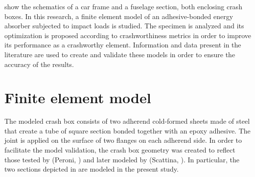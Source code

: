 \documentclass[cmfonts]{witpress}
\begin{document}
 show the schematics of a car frame and a fuselage section, both enclosing crash boxes. In this research, a finite element model of an adhesive-bonded energy absorber subjected to impact loads is studied. The specimen is analyzed and its optimization is proposed according to crashworthiness metrics in order to improve its performance as a crashworthy element. Information and data present in the literature are used to create and validate these models in order to ensure the accuracy of the results.

\section{Finite element model}
The modeled crash box consists of two adherend cold-formed sheets made of steel that create a tube of square section bonded together with an epoxy adhesive. The joint is applied on the surface of two flanges on each adherend side. In order to facilitate the model validation, the crash box geometry was created to reflect those tested by (Peroni, \cite{Peroni2009}) and later modeled by (Scattina, \cite{Scattina2011}). In particular, the two sections depicted in  are modeled in the present study.
\end{document}
